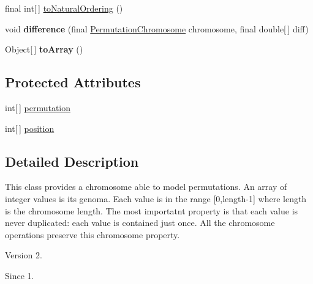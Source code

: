\begin{DoxyCompactItemize}
\item 
final int\mbox{[}$\,$\mbox{]} \hyperlink{classjenes_1_1chromosome_1_1_permutation_chromosome_a0aeb1df52bf751baa4706e5d94dae60d}{to\-Natural\-Ordering} ()
\item 
\hypertarget{classjenes_1_1chromosome_1_1_permutation_chromosome_a20c34256408cab0b265d69decd40dabd}{void {\bfseries difference} (final \hyperlink{classjenes_1_1chromosome_1_1_permutation_chromosome}{Permutation\-Chromosome} chromosome, final double\mbox{[}$\,$\mbox{]} diff)}\label{classjenes_1_1chromosome_1_1_permutation_chromosome_a20c34256408cab0b265d69decd40dabd}

\item 
\hypertarget{classjenes_1_1chromosome_1_1_permutation_chromosome_a8b14d4ba9c616335a901103f1879569a}{Object\mbox{[}$\,$\mbox{]} {\bfseries to\-Array} ()}\label{classjenes_1_1chromosome_1_1_permutation_chromosome_a8b14d4ba9c616335a901103f1879569a}

\end{DoxyCompactItemize}
\subsection*{Protected Attributes}
\begin{DoxyCompactItemize}
\item 
int\mbox{[}$\,$\mbox{]} \hyperlink{classjenes_1_1chromosome_1_1_permutation_chromosome_a8b5701fbbb3cdfef29d346e0375260fc}{permutation}
\item 
int\mbox{[}$\,$\mbox{]} \hyperlink{classjenes_1_1chromosome_1_1_permutation_chromosome_aeb2d393eb8a9cc106205e13fb88446cc}{position}
\end{DoxyCompactItemize}


\subsection{Detailed Description}
This class provides a chromosome able to model permutations. An array of integer values is its genoma. Each value is in the range \mbox{[}0,length-\/1\mbox{]} where length is the chromosome length. The most importatnt property is that each value is never duplicated\-: each value is contained just once. All the chromosome operations preserve this chromosome property.

\begin{DoxyVersion}{Version}
2. 
\end{DoxyVersion}
\begin{DoxySince}{Since}
1. 
\end{DoxySince}


